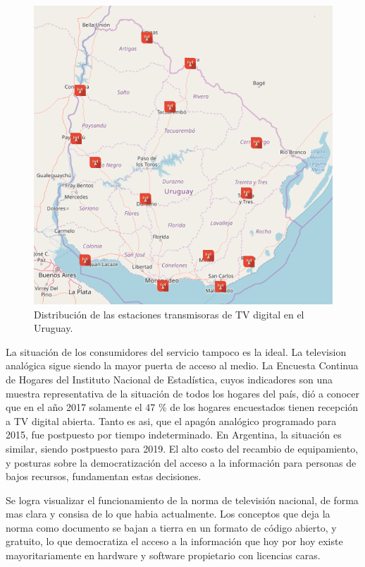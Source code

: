 \begin{figure}
\centering
\includegraphics[scale=0.3]{figuras/cap01/mapa_estaciones}
\caption{\label{mapa_estaciones} Distribución de las estaciones transmisoras de TV digital en el Uruguay.}
\end{figure}

La situación de los consumidores del servicio tampoco es la ideal. La television analógica sigue siendo la mayor puerta de acceso al medio. La Encuesta Continua de Hogares del Instituto Nacional de Estadística\cite{ine2017}, cuyos indicadores son una muestra representativa de la situación de todos los hogares del país, dió a conocer que en el año 2017 solamente el 47 \% de los hogares encuestados tienen recepción a TV digital abierta. Tanto es asi, que el apagón analógico programado para 2015, fue postpuesto por tiempo indeterminado. En Argentina, la situación es similar, siendo postpuesto para 2019. El alto costo del recambio de equipamiento, y posturas sobre la democratización del acceso a la información para personas de bajos recursos, fundamentan estas decisiones.
	
Se logra visualizar el funcionamiento de la norma de televisión nacional, de forma mas clara y consisa de lo que habia actualmente. Los conceptos que deja la norma como documento se bajan a tierra en un formato de código abierto, y gratuito, lo que democratiza el acceso a la información que hoy por hoy existe mayoritariamente en hardware y software propietario con licencias caras.
	
